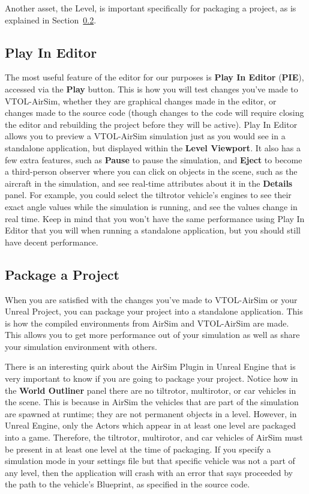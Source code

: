 Another asset, the  Level, is important specifically for packaging a project, as is explained in Section~\ref{sec:packaging}.

\subsection{Play In Editor}
The most useful feature of the editor for our purposes is \textbf{Play In Editor} (\textbf{PIE}), accessed via the \textbf{Play} button. This is how you will test changes you've made to VTOL-AirSim, whether they are graphical changes made in the editor, or changes made to the source code (though changes to the code will require closing the editor and rebuilding the project before they will be active). Play In Editor allows you to preview a VTOL-AirSim simulation just as you would see in a standalone application, but displayed within the \textbf{Level Viewport}. It also has a few extra features, such as \textbf{Pause} to pause the simulation, and \textbf{Eject} to become a third-person observer where you can click on objects in the scene, such as the aircraft in the simulation, and see real-time attributes about it in the \textbf{Details} panel. For example, you could select the tiltrotor vehicle's engines to see their exact angle values while the simulation is running, and see the values change in real time. Keep in mind that you won't have the same performance using Play In Editor that you will when running a standalone application, but you should still have decent performance.

\subsection{Package a Project}\label{sec:packaging}
When you are satisfied with the changes you've made to VTOL-AirSim or your Unreal Project, you can package your project into a standalone application. This is how the compiled environments from AirSim and VTOL-AirSim are made. This allows you to get more performance out of your simulation as well as share your simulation environment with others.

There is an interesting quirk about the AirSim Plugin in Unreal Engine that is very important to know if you are going to package your project. Notice how in the \textbf{World Outliner} panel there are no tiltrotor, multirotor, or car vehicles in the scene. This is because in AirSim the vehicles that are part of the simulation are spawned at runtime; they are not permanent objects in a level. However, in Unreal Engine, only the Actors which appear in at least one level are packaged into a game. Therefore, the tiltrotor, multirotor, and car vehicles of AirSim must be present in at least one level at the time of packaging. If you specify a simulation mode in your settings file but that specific vehicle was not a part of any level, then the application will crash with an error that says  proceeded by the path to the vehicle's Blueprint, as specified in the source code.

